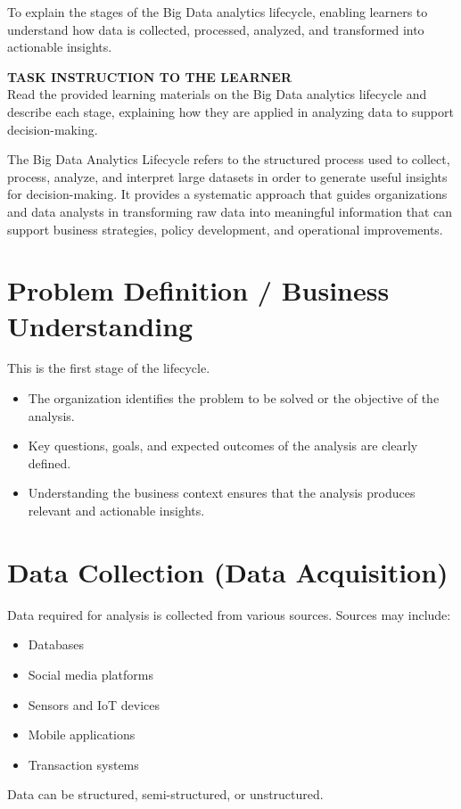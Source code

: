 \documentclass[12pt,a4paper]{article}
\begin{document}

\begin{mlos}
    \item To explain the stages of the Big Data analytics lifecycle, enabling learners to understand how data is collected, processed, analyzed, and transformed into actionable insights.
\end{mlos}

\begin{activities}
\textbf{TASK INSTRUCTION TO THE LEARNER} \\
Read the provided learning materials on the Big Data analytics lifecycle and describe each stage, explaining how they are applied in analyzing data to support decision-making.
\end{activities}

\mddescription
The Big Data Analytics Lifecycle refers to the structured process used to collect, process, analyze, and interpret large datasets in order to generate useful insights for decision-making. It provides a systematic approach that guides organizations and data analysts in transforming raw data into meaningful information that can support business strategies, policy development, and operational improvements.

\section{Problem Definition / Business Understanding}
This is the first stage of the lifecycle.
\begin{itemize}
    \item The organization identifies the problem to be solved or the objective of the analysis.
    \item Key questions, goals, and expected outcomes of the analysis are clearly defined.
    \item Understanding the business context ensures that the analysis produces relevant and actionable insights.
\end{itemize}

\section{Data Collection (Data Acquisition)}
Data required for analysis is collected from various sources.
Sources may include:
\begin{itemize}
    \item Databases
    \item Social media platforms
    \item Sensors and IoT devices
    \item Mobile applications
    \item Transaction systems
\end{itemize}
Data can be structured, semi-structured, or unstructured.
\end{document}
